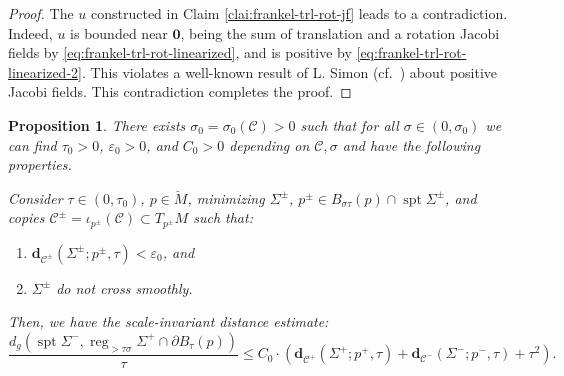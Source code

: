 \documentclass[11pt, letterpaper, reqno]{amsart}
\numberwithin{equation}{section}
\newtheorem{Prop}[Def]{Proposition}
\theoremstyle{remark}
\newcommand{\cC}{\mathcal{C}}
\newcommand{\mbfd}{\mathbf{d}}
\newcommand{\supp}{\operatorname{spt}}
\newcommand{\reg}{\operatorname{reg}}
\newcommand{\orig}{\mathbf{0}}
\newcommand{\eps}{\varepsilon}
\begin{document}
\begin{proof}
The $u$ constructed in Claim \ref{clai:frankel-trl-rot-jf} leads to a contradiction. Indeed, $u$ is bounded near $\orig$, being the sum of translation and a rotation Jacobi fields by  \eqref{eq:frankel-trl-rot-linearized}, and is positive by  \eqref{eq:frankel-trl-rot-linearized-2}. This violates a well-known result of L. Simon \cite{Simon:decay} (cf.\ \cite[Theorem 1.4]{Wang:smoothing}) about positive Jacobi fields. This contradiction completes the proof.
\end{proof}

\begin{Prop}\label{prop:close-to-cone-close-to-eachother}
There exists $\sigma_0=\sigma_0(\cC) > 0$ such that for all $\sigma \in (0, \sigma_0)$ we can find $\tau_0 > 0$, $\eps_0 > 0$, and $C_0 > 0$ depending on $\cC, \sigma$ and have the following properties. 

Consider $\tau \in (0,\tau_0)$, $p \in \breve M$, minimizing $\Sigma^\pm$, $p^\pm \in B_{\sigma \tau}(p) \cap \supp \Sigma^\pm$, and copies $\cC^\pm = \iota_{p^\pm}(\cC) \subset T_{p^\pm} M$ such that:
\begin{enumerate}
	\item[(1)] $\mbfd_{\cC^\pm}(\Sigma^\pm;p^\pm,\tau) < \eps_0$, and
	\item[(2)] $\Sigma^\pm$ do not cross smoothly.
\end{enumerate}
Then, we have the scale-invariant distance estimate:
\[
	\frac{d_g(\supp \Sigma^-, \reg_{>\tau \sigma} \Sigma^+ \cap \partial B_{\tau}(p))}{\tau} \leq C_0 \cdot (\mbfd_{\cC^+}(\Sigma^+;p^+,\tau) + \mbfd_{\cC^-}(\Sigma^-;p^-,\tau) + \tau^2).
\]
\end{Prop}
\end{document}
